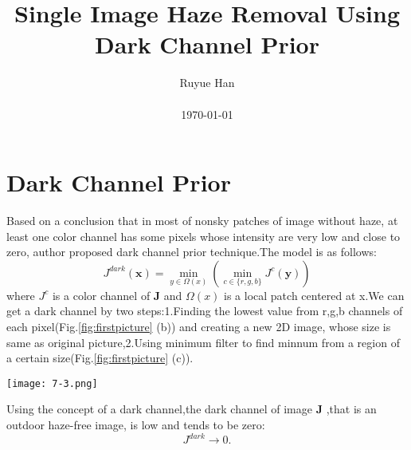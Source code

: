 \documentclass[10pt,twocolumn,letterpaper]{article}
\begin{document}
\title{Single Image Haze Removal Using Dark Channel Prior}

\author{Ruyue Han\\\\ \today}

\maketitle

\section{Dark Channel Prior}
Based on a conclusion that in most of nonsky patches of image without haze, at least one color channel has some pixels whose intensity are very low and close to zero, author proposed dark channel prior technique.The model is as follows:
\begin{equation}
J^{dark}(\textbf{x}) = \min_{y \in{\Omega (x)}}\left(\min_{c\in{\{r,g,b\}}}J^{c}\left(\textbf{y}\right) \right)
\end{equation}
where $J^{c}$ is a color channel of \textbf{J} and $\Omega (x)$ is a local patch
centered at x.We can get a dark channel by two steps:1.Finding the lowest value from r,g,b channels of each pixel(Fig.\ref{fig:firstpicture} (b)) and creating a new 2D image, whose size is same as original picture,2.Using minimum filter to find minnum from a region of a certain size(Fig.\ref{fig:firstpicture} (c)).\par
\begin{figure*}[htb]
\centering
\texttt{[image: 7-3.png]}
\caption{Calculation of a dark channel. (a) An arbitrary image J. (b) For each pixel, we calculate the minimum of its (r, g, b) values. (c) A minimum filter
is performed on (b). This is the dark channel of J. The image size is $800\times{551}$, and the patch size of $\Omega$ is $15 \times{15}$}
\label{fig:firstpicture}
\end{figure*}
Using the concept of a dark channel,the dark channel of image \textbf{J} ,that is an outdoor haze-free image, is low and tends to be zero:
\begin{equation}
J^{dark} \to 0.
\end{equation} 
\end{document}
